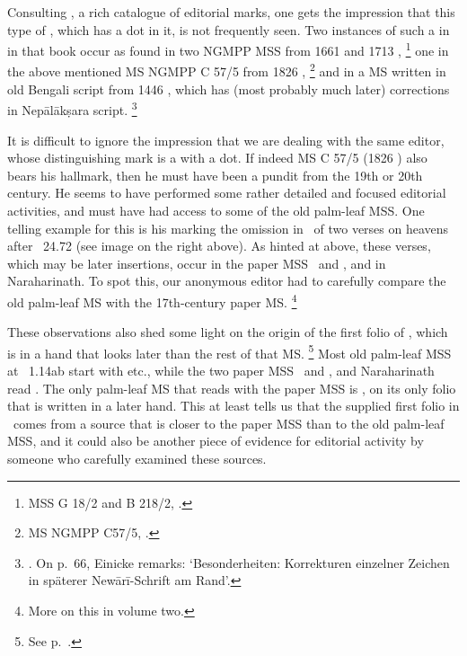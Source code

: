 \noindent
Consulting , 
a rich catalogue of editorial marks,
one gets the impression that this type 
of , which has a dot in it,
is not frequently seen. Two instances of such a 
  in in that book
  occur as found in two NGMPP 
  MSS from 1661 and 1713 \CE,%
 		\footnote{MSS G 18/2 and B 218/2, 
 							.}
one in the above mentioned MS NGMPP C 57/5 from 1826 \CE,%
		\footnote{MS NGMPP C57/5, 
							.} 
 and in a  MS written 
 in old Bengali script from 1446 \CE, 
 which has (most probably much later) corrections
 in Nepālākṣara script.%
 					 \footnote{.
 					 On p.~66, Einicke remarks: `Besonderheiten: 
 					 Korrekturen einzelner Zeichen in späterer 
 					 Newārī-Schrift am Rand'.}
 				 
It is difficult to ignore the impression that
we are dealing with the same editor, whose
distinguishing mark is a  
with a dot. If indeed MS C 57/5 (1826 \CE) also bears
his hallmark, then he must have been a pundit from 
the 19th or 20th century. He seems to have performed
some rather detailed and focused editorial activities, and
must have had access to some of the old palm-leaf MSS.
One telling example for this is his marking the omission
in \msNa\ of two  verses on heavens after
\VSS\ 24.72 (see image on the right above). 
As hinted at above, these verses, which may be
later insertions, occur in the paper MSS
 \msPaperA\ and \msPaperC, and in Naraharinath.
To spot this, our anonymous editor had to
carefully compare the old palm-leaf MS with the 
17th-century paper MS.%
		\footnote{More on this in volume two.}
 				 
\label{msCcfirstfoliokakapada}
These observations also shed some light on
the origin of the first folio of \msCc, which is in 
a hand that looks later than the rest of that MS.%
		\footnote{See p.~\pageref{msCcfirstfolio}.}			 
Most old palm-leaf MSS at \VSS\ 1.14ab 
start with 
etc., while the two paper MSS \msPaperA\ and \msPaperC, 
and Naraharinath read . The only palm-leaf MS that reads with 
the paper MSS is \msCc, on its only folio that is
written in a later hand. This at least tells us that
the supplied first folio in \msCc\ comes from a
source that is closer to the paper MSS than to the
old palm-leaf MSS, and it could also be another piece
of evidence for editorial activity by someone who
carefully examined these sources.   



